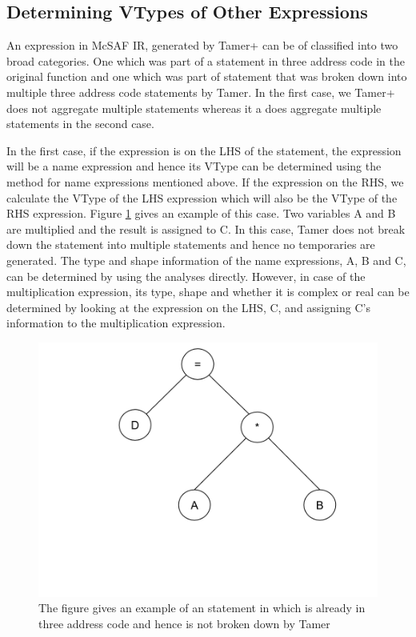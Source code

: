 \subsection{Determining VTypes of Other Expressions}
An expression in McSAF IR, generated by Tamer+ can be of classified into two broad categories. One which was part of a statement in three address code in the original \matlab function and one which was part of statement that was broken down into multiple three  address code statements by Tamer. In the first case, we Tamer+ does not aggregate multiple statements whereas it a does aggregate multiple statements in the second case.  

In the first case, if the expression is on the LHS of the statement, the expression will be a name expression and hence its VType can be determined using the method for name expressions mentioned above. If the expression on the RHS, we calculate the VType of the LHS expression which will also be the VType of the RHS expression. Figure \ref{Fig:notac} gives an example of this case. Two variables \textsf{A} and \textsf{B} are multiplied and the result is assigned to \textsf{C}. In this case, Tamer does not break down the statement into multiple statements and hence no temporaries are generated. The type and shape information of the name expressions, \textsf{A}, \textsf{B} and \textsf{C}, can be determined by using the analyses directly. However, in case of the multiplication expression, its type, shape and whether it is complex or real can be determined by looking at the expression on the LHS, \textsf{C}, and assigning \textsf{C}'s information to the multiplication expression. 
\begin{figure}[htbp]
\begin{center}
\includegraphics[scale=0.5]{Figures/no_tac.png}
\caption[Statement in \matlab in three address code]{The figure gives an example of an statement in \matlab which is already in three address code and hence is not broken down by Tamer }
\label{Fig:notac}
\end{center}
\end{figure}

